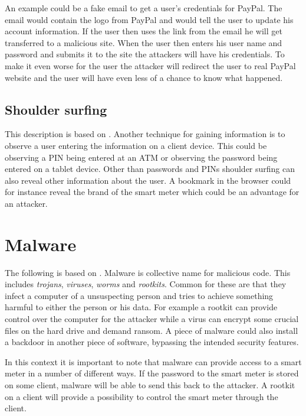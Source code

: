 An example could be a fake email to get a user's credentials for PayPal.
The email would contain the logo from PayPal and would tell the user to update his account information.
If the user then uses the link from the email he will get transferred to a malicious site.
When the user then enters his user name and password and submits it to the site the attackers will have his credentials.
To make it even worse for the user the attacker will redirect the user to real PayPal website and the user will have even less of a chance to know what happened.

\subsection{Shoulder surfing}\label{attack:shoulder}
This description is based on \citet{notechhack}.
Another technique for gaining information is to observe a user entering the information on a client device. 
This could be observing a PIN being entered at an ATM or observing the password being entered on a tablet device.
Other than passwords and PINs shoulder surfing can also reveal other information about the user.
A bookmark in the browser could for instance reveal the brand of the smart meter which could be an advantage for an attacker.

\section{Malware}\label{attack:malware}
The following is based on \citet[p.~644]{security_engineering_ross_anderson}.
Malware is collective name for malicious code. 
This includes \emph{trojans}, \emph{viruses}, \emph{worms} and \emph{rootkits}.
Common for these are that they infect a computer of a unsuspecting person and tries to achieve something harmful to either the person or his data.
For example a rootkit can provide control over the computer for the attacker while a virus can encrypt some crucial files on the hard drive and demand ransom.
A piece of malware could also install a backdoor in another piece of software, bypassing the intended security features.

In this context it is important to note that malware can provide access to a smart meter in a number of different ways.
If the password to the smart meter is stored on some client, malware will be able to send this back to the attacker.
A rootkit on a client will provide a possibility to control the smart meter through the client.

